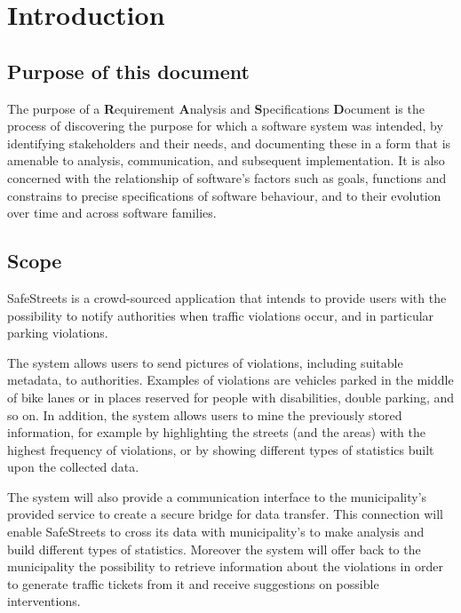 \section{Introduction}
\subsection{Purpose of this document}
The purpose of a \textbf{R}equirement \textbf{A}nalysis and \textbf{S}pecifications \textbf{D}ocument is the process of discovering the purpose for which a software system was intended, by identifying stakeholders and their needs, and documenting these in a form that is amenable to analysis, communication, and subsequent implementation. \cite{RE} It is also concerned with the relationship of software's factors such as goals, functions and constrains to precise specifications of software behaviour, and to their evolution over time and across software families. \cite{Zave}

\subsection{Scope}

	SafeStreets is a crowd-­sourced application that intends to provide users with the possibility to notify authorities when traffic violations occur, and in particular parking violations. 
	
	The system allows users to send pictures of violations, including suitable metadata, to authorities. Examples of violations are vehicles parked in the middle of bike lanes or in places reserved for people with disabilities, double parking, and so on. In addition, the system allows users to mine the previously stored information, for example by highlighting the streets (and the areas) with the highest frequency of violations, or by showing different types of statistics built upon the collected data.
	
	The system will also provide a communication interface to the municipality's provided service to create a secure bridge for data transfer. This connection will enable SafeStreets to cross its data with municipality's to make analysis and build different types of statistics. Moreover the system will offer back to the municipality the possibility to retrieve information about the violations in order to generate traffic tickets from it and receive suggestions on possible interventions. \cite{Assignments}
	
